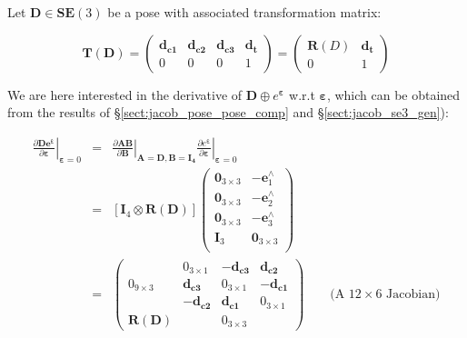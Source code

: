 \documentclass[a4paper,11pt]{report}
\newcommand{\E}{{\bm{\varepsilon}}}
\newcommand{\hatop}[1]{#1^\wedge}
\begin{document}
Let $\mathbf{D} \in \mathbf{SE}(3)$ be a pose with associated transformation matrix:

\begin{equation}
\mathbf{T}(\mathbf{D}) =
\left(
\begin{array}{ccc|c}
 \mathbf{d_{c1}}  & \mathbf{d_{c2}}  & \mathbf{d_{c3}}  & \mathbf{d_{t}}  \\
\hline
  0 & 0 & 0 & 1
\end{array}
\right)
=
\left(
\begin{array}{c|c}
 \mathbf{R}(D) & \mathbf{d_{t}} \\
\hline
     0 & 1
\end{array}
\right)
\end{equation}


We are here interested in the derivative of $\mathbf{D} \oplus e^\E$ w.r.t $\E$,
which can be obtained from the results of \S\ref{sect:jacob_pose_pose_comp} and \S\ref{sect:jacob_se3_gen}):

\begin{eqnarray}
\left. \frac{\partial \mathbf{D e^\E}}{\partial \E} \right|_{\E = 0}
&=&
\left. \frac{\partial \mathbf{A} \mathbf{B}}{\partial \mathbf{B} } \right|_{\mathbf{A}=\mathbf{D}, \mathbf{B}=\mathbf{I_4}}
\left. \frac{\partial e^\E}{\partial \E} \right|_{\E=0}
\\
&=&
\left[ \mathbf{I}_4 \otimes \mathbf{R}(\mathbf{D}) \right]
\left(
\begin{array}{cc}
 \mathbf{0}_{3\times 3}  & -\hatop{\mathbf{e}}_1 \\
 \mathbf{0}_{3\times 3}  & -\hatop{\mathbf{e}}_2 \\
 \mathbf{0}_{3\times 3}  & -\hatop{\mathbf{e}}_3 \\
 \mathbf{I}_{3}  & \mathbf{0}_{3\times 3} \\
\end{array}
\right)
\\
&=&
\left(
\begin{array}{c|ccc}
  ~  &  0_{3\times 1}  & -\mathbf{d_{c3}} & \mathbf{d_{c2}} \\
  0_{9\times 3}
     & \mathbf{d_{c3}} & 0_{3\times 1} & -\mathbf{d_{c1}} \\
  ~  &  -\mathbf{d_{c2}} & \mathbf{d_{c1}} & 0_{3\times 1} \\
\hline
  \mathbf{R}(\mathbf{D})   & ~ & 0_{3 \times 3} &
\end{array}
\right)
\quad\quad \text{(A $12 \times 6$ Jacobian)}
\end{eqnarray}
\end{document}
